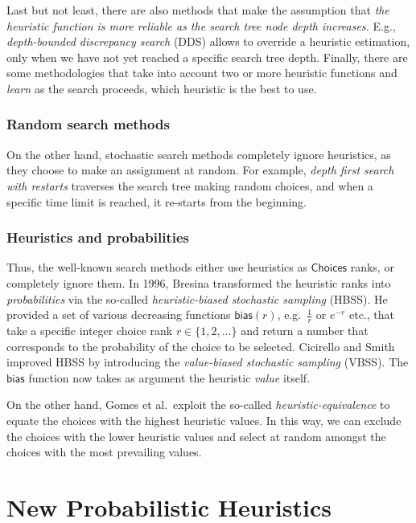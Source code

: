 \documentclass{ws-ijait}
\begin{document}
Last but not least, there are also methods that make the
assumption that \emph{the heuristic function is more
reliable as the search tree node depth increases.} E.g.,
\emph{depth-bounded discrepancy search} (DDS) allows to
override a heuristic estimation, only when we have not yet
reached a specific search tree depth.\cite{Walsh1997}
Finally, there are some methodologies that take into account
two or more heuristic functions and \emph{learn} as the
search proceeds, which heuristic is the best to
use.\cite{Xu2009}

\subsubsection{Random search methods\label{random}}

On the other hand, stochastic search methods completely
ignore heuristics, as they choose to make an assignment at
random.\cite{Jafari2011} For example, \emph{depth first
search with restarts} traverses the search tree making
random choices, and when a specific time limit is reached,
it re-starts from the beginning.

\subsubsection{Heuristics and probabilities}

Thus, the well-known search methods either use heuristics as
$\mathsf{Choices}$ ranks, or completely ignore them. In
1996, Bresina transformed the heuristic ranks into
\emph{probabilities} via the so-called
\emph{heuristic-biased stochastic sampling}
(HBSS).\cite{Bresina1996} He provided a set of various
decreasing functions $\mathsf{bias}(r)$, e.g.\ $\frac{1}{r}$
or $e^{-r}$ etc., that take a specific integer choice rank
$r \in \{1, 2, \ldots\}$ and return a number that
corresponds to the probability of the choice to be selected.
Cicirello and Smith improved HBSS by introducing the
\emph{value-biased stochastic sampling} (VBSS). The
$\mathsf{bias}$ function now takes as argument the heuristic
\emph{value} itself.\cite{Cicirello2005}

On the other hand, Gomes et al.\ exploit the so-called
\emph{heuristic-equivalence} to equate the choices with the
highest heuristic values.\cite{Gomes2000} In this way, we
can exclude the choices with the lower heuristic values and
select at random amongst the choices with the most
prevailing values.


\section{New Probabilistic
         Heuristics\label{probabilistic-heuristics}}
\end{document}
